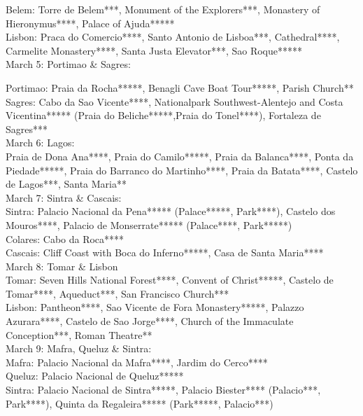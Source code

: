 Belem: Torre de Belem***, Monument of the Explorers***, Monastery of Hieronymus****, Palace of Ajuda*****\\
Lisbon: Praca do Comercio****, Santo Antonio de Lisboa***, Cathedral****, Carmelite Monastery****, Santa Justa Elevator***, Sao Roque*****\\

March 5: Portimao \& Sagres:

Portimao: Praia da Rocha*****, Benagli Cave Boat Tour*****, Parish Church**\\
Sagres: Cabo da Sao Vicente****, Nationalpark Southwest-Alentejo and Costa Vicentina***** (Praia do Beliche*****,Praia do Tonel****), Fortaleza de Sagres***\\

March 6: Lagos:\\
Praia de Dona Ana****, Praia do Camilo*****, Praia da Balanca****, Ponta da Piedade*****, Praia do Barranco do Martinho****, Praia da Batata****, Castelo de Lagos***, Santa Maria**\\

March 7: Sintra \& Cascais:\\

Sintra: Palacio Nacional da Pena***** (Palace*****, Park****), Castelo dos Mouros****, Palacio de Monserrate***** (Palace****, Park*****)\\
Colares: Cabo da Roca****\\
Cascais: Cliff Coast with Boca do Inferno*****, Casa de Santa Maria****\\

March 8: Tomar \& Lisbon\\

Tomar: Seven Hills National Forest****, Convent of Christ*****, Castelo de Tomar****, Aqueduct***, San Francisco Church***\\
Lisbon: Pantheon****, Sao Vicente de Fora Monastery*****, Palazzo Azurara****, Castelo de Sao Jorge****, Church of the Immaculate Conception***, Roman Theatre**\\

March 9: Mafra, Queluz \& Sintra:\\

Mafra: Palacio Nacional da Mafra****, Jardim do Cerco****\\
Queluz: Palacio Nacional de Queluz*****\\
Sintra: Palacio Nacional de Sintra*****, Palacio Biester**** (Palacio***, Park****), Quinta da Regaleira***** (Park*****, Palacio***)\\

